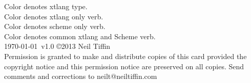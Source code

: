 \documentclass[10pt, twoside]{article}   	%
\begin{document}
\begin{multicols}{3}
\scriptsize
\flushleft
\textcolor{xtLangTypecolor}{Color denotes xtlang type.} \\
\textcolor{xtLangColor}{Color denotes xtlang only verb.} \\
\textcolor{schemeVerbColor}{Color denotes scheme only verb.} \\
\textcolor{xtLangSchemeVerbColor}{Color denotes common xtlang and Scheme verb.} \\
\vfill
\today~v1.0 \copyright 2013 Neil Tiffin \\
Permission is granted to make and distribute copies of this card provided the copyright notice and this permission notice are preserved on all copies.  Send comments and corrections to neilt@neiltiffin.com

\end{multicols}
\end{document}
